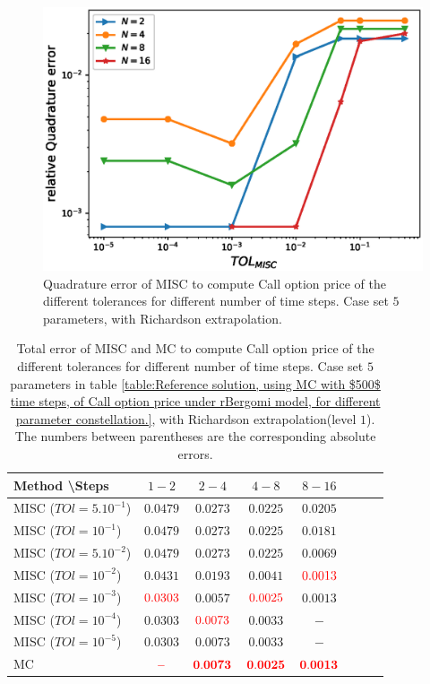 \documentclass[11pt]{article}
\begin{document}
\begin{figure}[h!]
	\centering
	\includegraphics[width=0.7\linewidth]{./figures/rBergomi_MISC_quadratre_error/vs_TOL/set5/relative_quad_error_wrt_MISC_TOL_set5_with_rich}
	
	
	\caption{Quadrature error of MISC to compute Call option price of the different tolerances for different number of time steps. Case  set $5$ parameters, with Richardson extrapolation.}
	\label{fig:Quadrature_error_set5_rich}
\end{figure}

\begin{table}[h!]
	\centering
	\begin{tabular}{l*{6}{c}r}
		Method \textbackslash  Steps            & $1-2$ & $2-4$ & $4-8$ & $8-16$  \\
		\hline
		MISC ($TOl=5.10^{-1}$)  & $0.0479$ & $0.0273$  & $0.0225$ & $0.0205$  \\
		MISC ($TOl=10^{-1}$)   & $0.0479$  &$0.0273$  &$0.0225$ & $0.0181$  \\
		MISC ($TOl=5.10^{-2}$)  &  $0.0479$ & $0.0273$  &$0.0225$ & $0.0069$  \\
			MISC ($TOl=10^{-2}$)  &  $0.0431$ & $0.0193$  & $0.0041$ & ${\color{red}0.0013}$  \\
		MISC ($TOl=10^{-3}$)  & ${\color{red}0.0303}$ & $0.0057$  & ${\color{red}0.0025}$ & $0.0013$  \\
		MISC ($TOl=10^{-4}$)   & $0.0303$ &${\color{red}0.0073}$ & $0.0033$  & $-$  \\
			MISC ($TOl=10^{-5}$)    &  $0.0303$ &$0.0073$  &  $0.0033$ & $-$  \\	
	\hline

		MC  & ${\color{red}\mathbf{-}}$  & ${\color{red}\mathbf{0.0073}}$  &   ${\color{red}\mathbf{0.0025}}$  &  ${\color{red}\mathbf{0.0013}}$  \\
		\hline
	\end{tabular}
	\caption{Total  error of MISC and MC to compute Call option price of the different tolerances for different number of time steps. Case set $5$ parameters in table \ref{table:Reference solution, using MC with $500$ time steps, of Call option price under rBergomi model, for different parameter constellation.}, with Richardson extrapolation(level $1$). The numbers between parentheses are the corresponding absolute errors.}
	\label{Total  error of MISC and MC to compute Call option price of the different tolerances for different number of time steps. Case set $5$ parameters, with Richardson extrapolation(level $1$). The numbers between parentheses are the corresponding absolute errors.}
\end{table}
\end{document}
